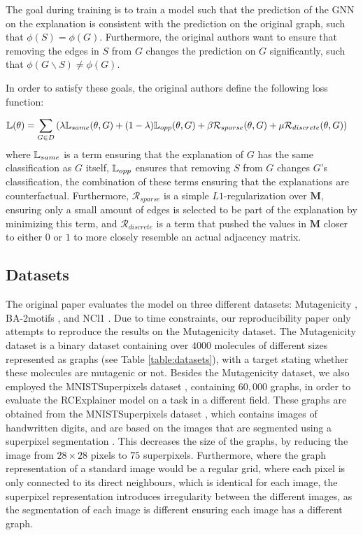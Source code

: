 The goal during training is to train a model such that the prediction of the GNN on the explanation is consistent with the prediction on the original graph, such that $\phi(S) = \phi(G)$. Furthermore, the original authors want to ensure that removing the edges in $S$ from $G$ changes the prediction on $G$ significantly, such that $\phi(G \backslash S) \neq \phi(G)$. 

In order to satisfy these goals, the original authors define the following loss function:

\begin{align}
    \mathbb{L}(\theta) &= \sum_{G \in D} \left( \lambda \mathbb{L}_{same}(\theta, G) + (1 - \lambda)\mathbb{L}_{opp}(\theta, G) + \beta \mathcal{R}_{sparse}(\theta, G) + \mu \mathcal{R}_{discrete}(\theta, G)\right)
\end{align}
where $\mathbb{L}_{same}$ is a term ensuring that the explanation of $G$ has the same classification as $G$ itself, $\mathbb{L}_{opp}$ ensures that removing $S$ from $G$ changes $G$'s classification, the combination of these terms ensuring that the explanations are counterfactual. Furthermore, $\mathcal{R}_{sparse}$ is a simple $L1$-regularization over $\textbf{M}$, ensuring only a small amount of edges is selected to be part of the explanation by minimizing this term, and $\mathcal{R}_{discrete}$ is a term that pushed the values in $\textbf{M}$ closer to either $0$ or $1$ to more closely resemble an actual adjacency matrix.

\subsection{Datasets}
The original paper evaluates the model on three different datasets: Mutagenicity \cite{mutagenicity}, BA-2motifs \cite{luo2020parameterized}, and NCl1 \cite{nci1}. Due to time constraints, our reproducibility paper only attempts to reproduce the results on the Mutagenicity dataset. The Mutagenicity dataset is a binary dataset containing over $4000$ molecules of different sizes represented as graphs (see Table \ref{table:datasets}), with a target stating whether these molecules are mutagenic or not.
Besides the Mutagenicity dataset, we also employed the MNISTSuperpixels dataset \cite{monti2016geometric}, containing $60,000$ graphs, in order to evaluate the RCExplainer model on a task in a different field. These graphs are obtained from the MNISTSuperpixels dataset \cite{lecun2010mnist}, which contains images of handwritten digits, and are based on the images that are segmented using a superpixel segmentation \cite{superpixels}. This decreases the size of the graphs, by reducing the image from $28 \times 28$ pixels to $75$ superpixels. Furthermore, where the graph representation of a standard image would be a regular grid, where each pixel is only connected to its direct neighbours, which is identical for each image, the superpixel representation introduces irregularity between the different images, as the segmentation of each image is different ensuring each image has a different graph.

